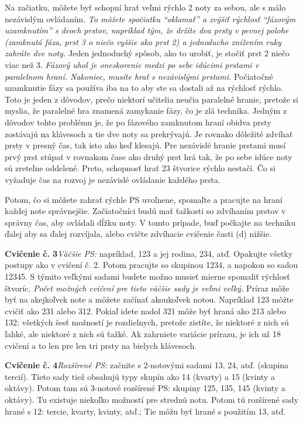 Na začiatku, môžete byť schopní hrať veľmi rýchlo 2 noty za sebou, ale s málo nezávislým ovládaním. \emph{To môžete spočiatku “oklamať” a zvýšiť rýchlosť “fázovým uzamknutím” s dvoch prstov, napríklad tým, že držíte dva prsty v pevnej polohe (zamknutá fáza, prst 3 o niečo vyššie ako prst 2) a jednoducho znížením ruky zahráte dve noty.} Jeden jednoduchý spôsob, ako to urobiť, je stočiť prst 2 niečo viac než 3. \emph{Fázový uhol je oneskorenie medzi po sebe idúcimi prstami v paralelnom hraní. Nakoniec, musíte hrať s nezávislými prstami.} Počiatočné uzamknutie fázy sa používa iba na to aby ste sa dostali až na rýchlosť rýchlo. Toto je jeden z dôvodov, prečo niektorí učitelia neučia paralelné hranie, pretože si myslia, že paralelné hra znamená zamykanie fázy, čo je zlá technika. Jedným z dôvodov tohto problému je, že po fázového zamknutom hraní obidva prsty zostávajú na klávesoch a tie dve noty sa prekrývajú. Je rovnako dôležité zdvíhať prsty v presný čas, tak isto ako keď klesajú. Pre nezávislé hranie prstami musí prvý prst stúpať v rovnakom čase ako druhý prst hrá tak, že po sebe idúce noty sú zreteľne oddelené. Preto, schopnosť hrať 23 štvorice rýchlo nestačí. Čo si vyžaduje čas na rozvoj je nezávislé ovládanie každého prsta.

Potom, čo si môžete zahrať rýchle PS uvoľnene, spomaľte a pracujte na hraní každej note správnejšie. Začiatočníci budú mať ťažkosti so zdvíhaním prstov v správny čas, aby ovládali dĺžku noty. V tomto prípade, buď počkajte na techniku ďalej aby sa ďalej rozvíjala, alebo cvičte zdvíhacie cvičenie časti (d) nižšie.

\textbf{Cvičenie č. 3}\enspace \emph{Väčšie PS:} napríklad, 123 a jej rodina, 234, atď. Opakujte všetky postupy ako v cvičení č. 2. Potom pracujte so skupinou 1234, a napokon so sadou 12345. S týmito veľkými sadami budete možno musieť mierne spomaliť rýchlosť štvoríc. \emph{Počet možných cvičení pre tieto väčšie sady je veľmi veľký.} Príraz môže byť na akejkoľvek note a môžete začínať akoukoľvek notou. Napríklad 123 môžte cvičiť ako 231 alebo 312. Pokiaľ idete nadol 321 môže byť hraná ako 213 alebo 132; všetkých šesť možností je rozdielnych, pretože zistíte, že niektoré z nich sú ľahké, ale niektoré z nich sú ťažké. Ak zahrniete variácie prírazu, je ich už 18 cvičení a to len pre len tri prsty na bielych klávesoch.

\textbf{Cvičenie č. 4}\enspace \emph{Rozšírené PS:} začnite s 2-notovými sadami 13, 24, atď. (skupina tercií). Tieto sady tiež obsahujú typy skupín ako 14 (kvarty) a 15 (kvinty a oktávy). Potom tam sú 3-notové rozšírené PS: skupiny 125, 135, 145 (kvinty a oktávy). Tu existuje niekoľko možností pre strednú notu. Potom tú rozšírené sady hrané s 12: tercie, kvarty, kvinty, atď.; Tie môžu byť hrané s použitím 13, atď.

